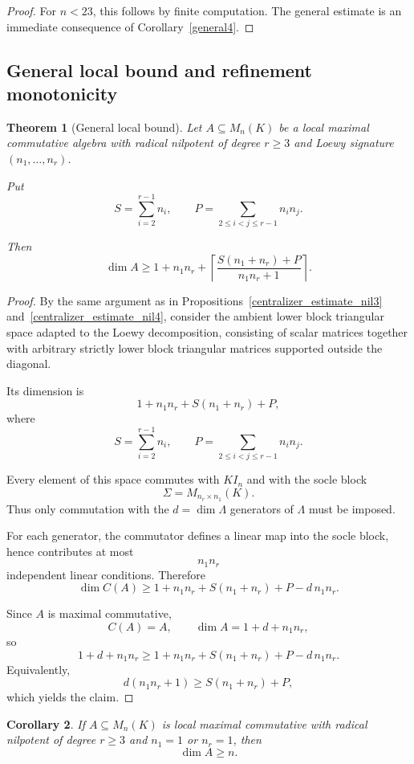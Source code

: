 \documentclass[11pt]{article}
\theoremstyle{remark}
\theoremstyle{plain}
\newtheorem{theorem}{Theorem}
\newtheorem{corollary}[theorem]{Corollary}
\theoremstyle{definition}
\theoremstyle{myremark}
\begin{document}
\begin{proof}
	For \(n<23\), this follows by finite computation. The general estimate is
	an immediate consequence of Corollary~\ref{general4}.
\end{proof}
\subsection{General local bound and refinement monotonicity}

\begin{theorem}[General local bound]
	\label{local_bound}
	Let \(A\subseteq M_n(K)\) be a local maximal commutative algebra with
	radical nilpotent of degree \(r\ge3\) and Loewy signature
	\((n_1,\dots,n_r)\).
	
	Put
	\[
	S=\sum_{i=2}^{r-1} n_i,	\qquad	P=\sum_{2\le i<j\le r-1} n_i n_j.
	\]
	
	Then
	\[	\dim A	\ge	1+n_1n_r+	\left\lceil	\frac{S(n_1+n_r)+P}{n_1n_r+1}\right\rceil.
	\]
\end{theorem}

\begin{proof}
	By the same argument as in Propositions~\ref{centralizer_estimate_nil3}
	and~\ref{centralizer_estimate_nil4}, consider the ambient lower block
	triangular space adapted to the Loewy decomposition, consisting of scalar
	matrices together with arbitrary strictly lower block triangular matrices
	supported outside the diagonal.
	
	Its dimension is
	\[
	1+n_1n_r+S(n_1+n_r)+P,
	\]
	where
	\[
	S=\sum_{i=2}^{r-1} n_i,	\qquad	P=\sum_{2\le i<j\le r-1} n_in_j.
	\]
	
	Every element of this space commutes with \(KI_n\) and with the socle block
	\[
	\Sigma=M_{n_r\times n_1}(K).
	\]
	Thus only commutation with the \(d=\dim\Lambda\) generators of
	\(\Lambda\) must be imposed.
	
	For each generator, the commutator defines a linear map into the socle
	block, hence contributes at most
	\[
	n_1n_r
	\]
	independent linear conditions. Therefore
	\[
	\dim C(A)\ge 1+n_1n_r+S(n_1+n_r)+P-d\,n_1n_r.
	\]
	
	Since \(A\) is maximal commutative,
	\[	C(A)=A,	\qquad	\dim A=1+d+n_1n_r,
	\]
	so
	\[
	1+d+n_1n_r
	\ge
	1+n_1n_r+S(n_1+n_r)+P-d\,n_1n_r.
	\]
	Equivalently,
	\[
	d(n_1n_r+1)\ge S(n_1+n_r)+P,
	\]
	which yields the claim.
\end{proof}

\begin{corollary}
	If \(A\subseteq M_n(K)\) is local maximal commutative with radical
	nilpotent of degree \(r\ge3\) and \(n_1=1\) or \(n_r=1\), then
	\[
	\dim A\ge n.
	\]
\end{corollary}
\end{document}
